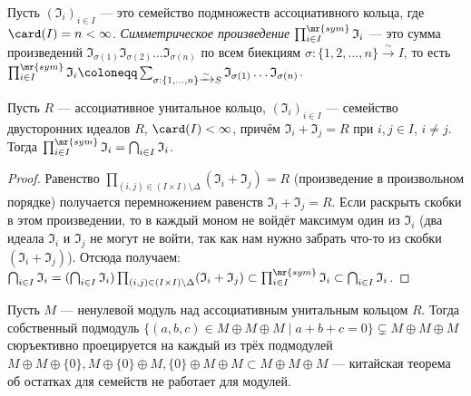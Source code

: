 \documentclass[
	extrafontsizes,
	11pt,
	hyphens,
]{memoir}
\begin{document}
\begin{definition}
Пусть $(\mathfrak{I}_i)_{i \in I}$ --- это семейство подмножеств ассоциативного кольца, где
$\card(I) = n < \infty$.
\emph{Симметрическое произведение} $\prod^{\mr{sym}}_{i \in I} \mathfrak{I}_i$ --- это сумма произведений
$\mathfrak{I}_{\sigma(1)} \mathfrak{I}_{\sigma(2)} \dots \mathfrak{I}_{\sigma(n)}$
по всем биекциям
$\sigma : \{1, 2, \dots, n\} \xrightarrow{\sim} I$,
то есть
\(
\prod^{\mr{sym}}_{i \in I} \mathfrak{I}_i
\coloneqq
\sum_{\sigma : \{1, \dots{}, n\} \xrightarrow{\sim} S}
\mathfrak{I}_{\sigma(1)} \dots \mathfrak{I}_{\sigma(n)}
\).
\end{definition}

\begin{theorem}
Пусть $R$ --- ассоциативное унитальное кольцо,
$(\mathfrak{I}_i)_{i \in I}$ --- семейство двусторонних идеалов $R$,
$\card(I) < \infty$, причём $\mathfrak{I}_i + \mathfrak{I}_j = R$ при $i,j \in I$, $i \neq j$.
Тогда $\prod^{\mr{sym}}_{i \in I} \mathfrak{I}_i = \bigcap_{i \in I} \mathfrak{I}_i$.
\end{theorem}

\begin{proof}
Равенство $\prod_{(i,j) \in (I \times I) \setminus \Delta} (\mathfrak{I}_i + \mathfrak{I}_j) = R$ (произведение в произвольном порядке) получается перемножением равенств $\mathfrak{I}_i + \mathfrak{I}_j = R$.
Если раскрыть скобки в этом произведении, то в каждый моном не войдёт максимум один из $\mathfrak{I}_i$ (два идеала $\mathfrak{I}_i$ и $\mathfrak{I}_j$ не могут не войти, так как нам нужно забрать что-то из скобки $(\mathfrak{I}_i + \mathfrak{I}_j)$).
Отсюда получаем:
$
\bigcap_{i \in I} \mathfrak{I}_i
=
(\bigcap_{i \in I} \mathfrak{I}_i)
\prod_{(i,j) \in (I \times I) \setminus \Delta} (\mathfrak{I}_i + \mathfrak{I}_j)
\subset
\prod^{\mr{sym}}_{i \in I} \mathfrak{I}_i
\subset
\bigcap_{i \in I} \mathfrak{I}_i
$.
\end{proof}

\begin{example}
Пусть \(M\) --- ненулевой модуль над ассоциативным унитальным кольцом \(R\).
Тогда собственный подмодуль \(\{(a,b,c) \in M \oplus M \oplus M \mid a + b + c = 0\} \varsubsetneq M \oplus M \oplus M\) сюръективно проецируется на каждый из трёх подмодулей \(M \oplus M \oplus \{0\}, M \oplus \{0\} \oplus M, \{0\} \oplus M \oplus M \subset M \oplus M \oplus M\)
--- китайская теорема об остатках для семейств не работает для модулей.
\end{example}
\end{document}

